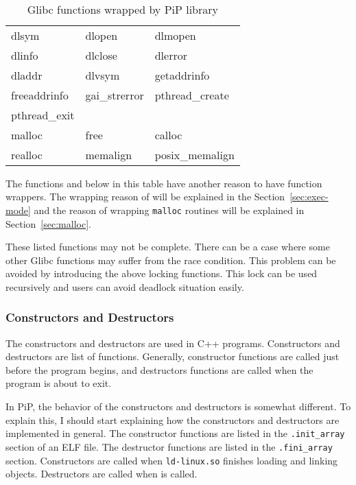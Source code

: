 \begin{table}[ht]
  \centering
  \caption{Glibc functions wrapped by PiP library}\label{tbl:pip-wrapper}
  \vspace{3mm}
  \tt
  \begin{tabular}{lll}
    \hline
    dlsym	&
    dlopen	&
    dlmopen	\\
    dlinfo	&
    dlclose	&
    dlerror	\\
    dladdr	&
    dlvsym	&
    getaddrinfo	\\
    freeaddrinfo &
    gai_strerror &
    pthread_create \\
    \hline
    pthread_exit \\
    \hline
    malloc 	&
    free	&
    calloc	\\
    realloc	&
    memalign 	&
    posix_memalign \\
    \hline
  \end{tabular}
\end{table}

The functions  and below in this table have
another reason to have function wrappers. The wrapping reason of
 will be explained in the 
Section~\ref{sec:exec-mode} and the reason of wrapping {\tt malloc}
routines will be explained in Section~\ref{sec:malloc}. 

These listed functions may not be complete. There can
be a case where some other Glibc functions may suffer from the
race condition. This problem can be avoided by introducing the above
locking functions. This lock can be used recursively and users can
avoid deadlock situation easily. 

\subsubsection{Constructors and Destructors}

The constructors and destructors are used in C++
programs. Constructors and destructors are list of
functions. Generally, constructor functions are called just before the 
program begins, and destructors functions are called when the program
is about to exit.

In PiP, the behavior of the constructors and destructors is
somewhat different. To explain this, I should start explaining how the
constructors and destructors are implemented in general. The
constructor functions are listed in the {\tt .init_array} section of an ELF
file. The destructor functions are listed in the {\tt .fini_array}
section. Constructors are called when {\tt ld-linux.so} finishes
loading and linking objects. Destructors are called when
 is called. 

